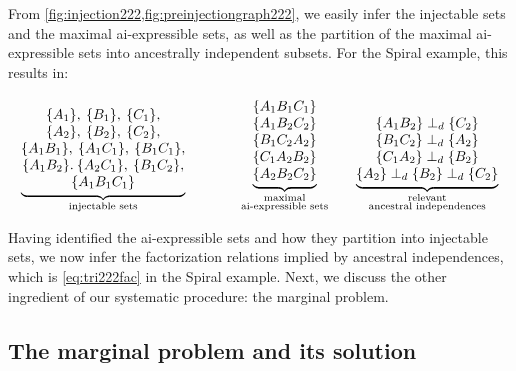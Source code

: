 \documentclass[aps,english,10pt,superscriptaddress,onecolumn,twoside,longbibliography,pra,floatfix,fleqn,nofootinbib]{revtex4-1}%
\theoremstyle{definition}
\newcounter{example}[section]
\newcommand{\aindep}{\ensuremath{\perp_d}} %
\DeclarePairedDelimiter{\braces}{\lbrace}{\rbrace}
\newcommand{\brackets}[1]{\braces*{#1}}
\begin{document}
From \cref{fig:injection222,fig:preinjectiongraph222}, we easily infer the injectable sets and the maximal ai-expressible sets, as well as the partition of the maximal ai-expressible sets into ancestrally independent subsets. For the Spiral example, this results in:
\begin{align}\label{eq:basicsetup222}
{\underbrace{\begin{matrix}
\, \\
\brackets{A_1},\:\brackets{B_1},\:\brackets{C_1},\\
\brackets{A_2},\:\brackets{B_2},\:\brackets{C_2},\\
\brackets{A_1 B_1},\:\brackets{A_1 C_1},\:\brackets{B_1 C_1},\\
\brackets{A_1 B_2}.\:\brackets{A_2 C_1},\:\brackets{B_1 C_2},\\
\brackets{A_1 B_1 C_1}
\end{matrix}}_{\substack{\text{injectable sets}}}}
\qquad\qquad
{\underbrace{\begin{matrix}
\brackets{A_1 B_1 C_1} \\
\brackets{A_1 B_2 C_2} \\
\brackets{B_1 C_2 A_2} \\
\brackets{C_1 A_2 B_2} \\
\brackets{A_2 B_2 C_2}
\end{matrix}}_{\substack{\text{maximal}\\\text{ai-expressible sets}}}}
\qquad
{\underbrace{\begin{matrix}
\\
\{A_1 B_2\} \aindep \{ C_2\} \\
\{B_1 C_2\} \aindep \{ A_2\} \\
\{C_1 A_2\} \aindep \{ B_2\} \\
\{A_2\} \aindep \{B_2\} \aindep \{ C_2\}
\end{matrix}}_{\substack{\text{relevant}\\\text{ancestral independences}}}}
\end{align}

Having identified the ai-expressible sets and how they partition into injectable sets, we now infer the factorization relations implied by ancestral independences, which is \cref{eq:tri222fac} in the Spiral example. Next, we discuss the other ingredient of our systematic procedure: the marginal problem.

\subsection{The marginal problem and its solution}
\label{step:marginalsproblem}
\end{document}
